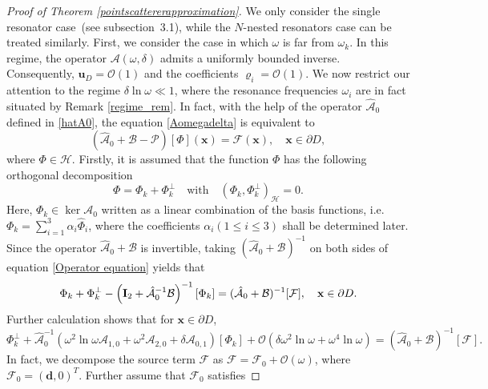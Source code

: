 \documentclass[10pt,reqno,oneside]{amsart}%
\theoremstyle{definition}
\theoremstyle{remark}
\numberwithin{equation}{section}
\numberwithin{equation}{section}
\begin{document}
\begin{proof}[Proof of Theorem \ref{pointscattererapproximation}]
We only consider the single resonator case~(see subsection~3.1), while the $N$-nested resonators case can be treated similarly. First, we consider the case in which $\omega$ is far from $\omega_k$. In this regime, the operator $\mathcal{A}(\omega,\delta)$ admits a uniformly bounded inverse. Consequently, $\mathbf{u}_D=\mathcal{O}(1)$ and the coefficients $\varrho_i=\mathcal{O}(1)$.
We now restrict our attention to the regime $\delta\ln\omega\ll 1$, where the resonance frequencies $\omega_i$ are in fact situated by Remark \ref{regime_rem}. In fact, with the help of the operator $\hat{\mathcal{A}}_{0}$ defined in \eqref{hatA0}, the equation \eqref{Aomegadelta} is equivalent to
\begin{equation}\label{Operator equation}
	(\hat{\mathcal{A}}_{0}+\mathcal{B}-\mathcal{P})[\Phi](\mathbf{x})=\mathcal{F}(\mathbf{x}), \quad \mathbf{x} \in \partial D,
\end{equation}
where $\Phi\in\mathcal{H}$. Firstly, it is assumed that the function $\Phi$ has the following orthogonal decomposition%
$$
\Phi=\Phi_k+\Phi_k^{\bot}\quad \text{with}\quad (\Phi_{k},\Phi_k^{\bot})_{\mathcal{H}}=0.
$$
Here, $\Phi_k\in\ker\mathcal{A}_0$ written as a linear combination of the basis functions, i.e. $\Phi_k=\sum_{i=1}^3\alpha_i\hat\Phi_i$, where the coefficients $\alpha_i(1\leq i\leq3)$ shall be determined later. Since the operator $\hat{\mathcal{A}}_0+\mathcal{B}$ is invertible, taking $(\hat{\mathcal{A}}_0+\mathcal{B})^{-1}$ on both sides of equation \eqref{Operator equation} yields that
\begin{equation}
	\Phi_k+\Phi_k^{\bot}-\left(\mathbf{I}_2+\hat{\mathcal{A}}_0^{-1}\mathcal{B}\right)^{-1}[\Phi_k]=(\hat{\mathcal{A}}_0+\mathcal{B})^{-1}[\mathcal{F}], \quad \mathbf{x} \in \partial D.	\notag
\end{equation}
Further calculation shows that for $\mathbf{x} \in \partial D$,
\begin{equation}\label{Fequality}
	\Phi_k^{\bot}+\hat{\mathcal{A}}_0^{-1}\left(\omega^2\ln\omega\mathcal{A}_{1,0}+\omega^2\mathcal{A}_{2,0}+\delta\mathcal{A}_{0,1}
	\right)[\Phi_k]+\mathcal{O}(\delta\omega^2\ln{\omega}+\omega^4\ln{\omega})=(\hat{\mathcal{A}}_0+\mathcal{B})^{-1}[\mathcal{F}].
\end{equation}
In fact, we decompose the source term $\mathcal{F}$ as $\mathcal{F}=\mathcal{F}_0+\mathcal{O}(\omega)$, where $\mathcal{F}_0=(\mathbf{d},0)^T$. Further assume that $\mathcal{F}_0$ satisfies

\end{proof}
\end{document}
